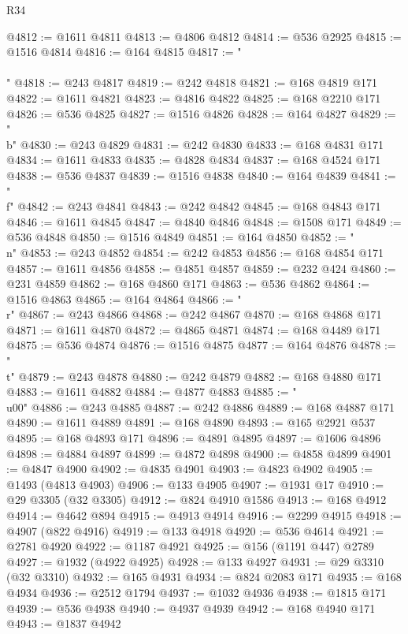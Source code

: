 \begin{lexlean}{R34}
\begin{coremodule}
@4812 := @1611 @4811
@4813 := @4806 @4812
@4814 := @536 @2925
@4815 := @1516 @4814
@4816 := @164 @4815
@4817 := "\\\\"
@4818 := @243 @4817
@4819 := @242 @4818
@4821 := @168 @4819 @171
@4822 := @1611 @4821
@4823 := @4816 @4822
@4825 := @168 @2210 @171
@4826 := @536 @4825
@4827 := @1516 @4826
@4828 := @164 @4827
@4829 := "\\b"
@4830 := @243 @4829
@4831 := @242 @4830
@4833 := @168 @4831 @171
@4834 := @1611 @4833
@4835 := @4828 @4834
@4837 := @168 @4524 @171
@4838 := @536 @4837
@4839 := @1516 @4838
@4840 := @164 @4839
@4841 := "\\f"
@4842 := @243 @4841
@4843 := @242 @4842
@4845 := @168 @4843 @171
@4846 := @1611 @4845
@4847 := @4840 @4846
@4848 := @1508 @171
@4849 := @536 @4848
@4850 := @1516 @4849
@4851 := @164 @4850
@4852 := "\\n"
@4853 := @243 @4852
@4854 := @242 @4853
@4856 := @168 @4854 @171
@4857 := @1611 @4856
@4858 := @4851 @4857
@4859 := @232 @424
@4860 := @231 @4859
@4862 := @168 @4860 @171
@4863 := @536 @4862
@4864 := @1516 @4863
@4865 := @164 @4864
@4866 := "\\r"
@4867 := @243 @4866
@4868 := @242 @4867
@4870 := @168 @4868 @171
@4871 := @1611 @4870
@4872 := @4865 @4871
@4874 := @168 @4489 @171
@4875 := @536 @4874
@4876 := @1516 @4875
@4877 := @164 @4876
@4878 := "\\t"
@4879 := @243 @4878
@4880 := @242 @4879
@4882 := @168 @4880 @171
@4883 := @1611 @4882
@4884 := @4877 @4883
@4885 := "\\u00"
@4886 := @243 @4885
@4887 := @242 @4886
@4889 := @168 @4887 @171
@4890 := @1611 @4889
@4891 := @168 @4890
@4893 := @165 @2921 @537
@4895 := @168 @4893 @171
@4896 := @4891 @4895
@4897 := @1606 @4896
@4898 := @4884 @4897
@4899 := @4872 @4898
@4900 := @4858 @4899
@4901 := @4847 @4900
@4902 := @4835 @4901
@4903 := @4823 @4902
@4905 := @1493 (@4813 @4903)
@4906 := @133 @4905
@4907 := @1931 @17
@4910 := @29 @3305 (@32 @3305)
@4912 := @824 @4910 @1586
@4913 := @168 @4912
@4914 := @4642 @894
@4915 := @4913 @4914
@4916 := @2299 @4915
@4918 := @4907 (@822 @4916)
@4919 := @133 @4918
@4920 := @536 @4614
@4921 := @2781 @4920
@4922 := @1187 @4921
@4925 := @156 (@1191 @447) @2789
@4927 := @1932 (@4922 @4925)
@4928 := @133 @4927
@4931 := @29 @3310 (@32 @3310)
@4932 := @165 @4931
@4934 := @824 @2083 @171
@4935 := @168 @4934
@4936 := @2512 @1794
@4937 := @1032 @4936
@4938 := @1815 @171
@4939 := @536 @4938
@4940 := @4937 @4939
@4942 := @168 @4940 @171
@4943 := @1837 @4942

\end{coremodule}
\end{lexlean}
